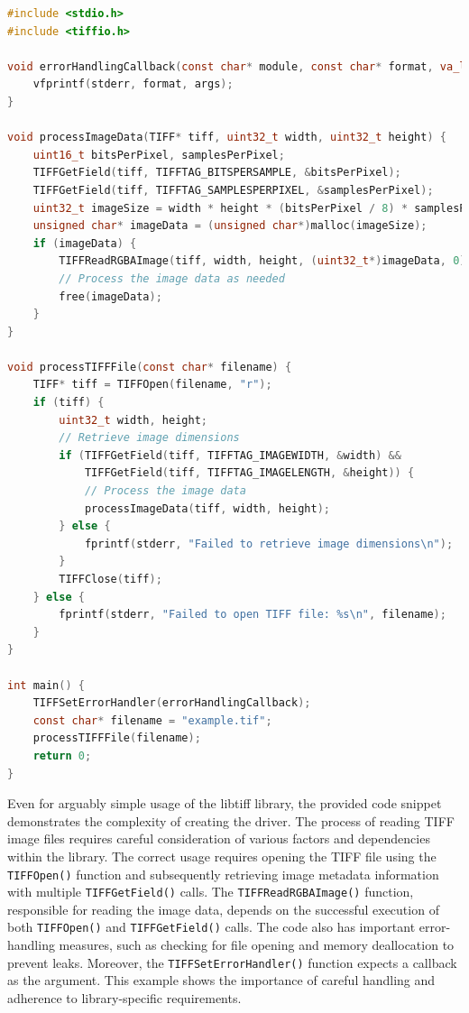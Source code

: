 \documentclass[a4paper,11pt,oneside]{report}
\begin{document}
\begin{lstlisting}[language={c}]
#include <stdio.h>
#include <tiffio.h>

void errorHandlingCallback(const char* module, const char* format, va_list args) {
    vfprintf(stderr, format, args);
}

void processImageData(TIFF* tiff, uint32_t width, uint32_t height) {
    uint16_t bitsPerPixel, samplesPerPixel;
    TIFFGetField(tiff, TIFFTAG_BITSPERSAMPLE, &bitsPerPixel);
    TIFFGetField(tiff, TIFFTAG_SAMPLESPERPIXEL, &samplesPerPixel);
    uint32_t imageSize = width * height * (bitsPerPixel / 8) * samplesPerPixel;
    unsigned char* imageData = (unsigned char*)malloc(imageSize);
    if (imageData) {
        TIFFReadRGBAImage(tiff, width, height, (uint32_t*)imageData, 0);
        // Process the image data as needed
        free(imageData);
    }
}

void processTIFFFile(const char* filename) {
    TIFF* tiff = TIFFOpen(filename, "r");
    if (tiff) {
        uint32_t width, height;
        // Retrieve image dimensions
        if (TIFFGetField(tiff, TIFFTAG_IMAGEWIDTH, &width) &&
            TIFFGetField(tiff, TIFFTAG_IMAGELENGTH, &height)) {
            // Process the image data
            processImageData(tiff, width, height);
        } else {
            fprintf(stderr, "Failed to retrieve image dimensions\n");
        }
        TIFFClose(tiff);
    } else {
        fprintf(stderr, "Failed to open TIFF file: %s\n", filename);
    }
}

int main() {
    TIFFSetErrorHandler(errorHandlingCallback);
    const char* filename = "example.tif";
    processTIFFFile(filename);
    return 0;
}
\end{lstlisting}


Even for arguably simple usage of the libtiff library, the provided code 
snippet demonstrates the complexity of creating the driver. The process of reading 
TIFF image files requires careful consideration of various factors and 
dependencies within the library. The correct usage requires opening the TIFF 
file using the \lstinline{TIFFOpen()} function and subsequently retrieving image metadata
information with multiple \lstinline{TIFFGetField()} calls. The \lstinline{TIFFReadRGBAImage()} function, 
responsible for reading the image data, depends on the successful execution of both 
\lstinline{TIFFOpen()} and \lstinline{TIFFGetField()} calls. The code also has 
important error-handling measures, such as checking for file opening and 
memory deallocation to prevent leaks. Moreover, the \lstinline{TIFFSetErrorHandler()} 
function expects a callback as the argument. This example shows the importance of 
careful handling and adherence to library-specific requirements.
\end{document}
